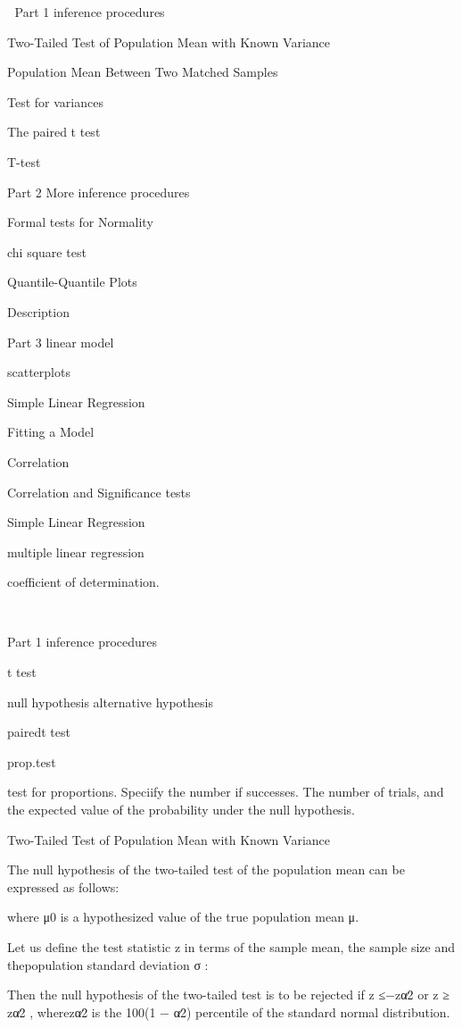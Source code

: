 

Part 1 inference procedures

Two-Tailed Test of Population Mean with Known Variance

Population Mean Between Two Matched Samples

Test for variances

The paired t test

T-test

Part 2 More inference procedures

Formal tests for Normality

chi square test

Quantile-Quantile Plots

Description

Part 3 linear model

scatterplots

Simple Linear Regression

Fitting a Model

Correlation

Correlation and Significance tests

Simple Linear Regression

multiple linear regression

coefficient of determination.




Part 1 inference procedures

t test

null hypothesis alternative hypothesis

pairedt test 

prop.test


test for proportions. Speciify the number if successes.  The number of trials, and the expected value of the probability under the null hypothesis.

Two-Tailed Test of Population Mean with Known Variance

The null hypothesis of the two-tailed test of the population mean can be expressed as follows:



where μ0 is a hypothesized value of the true population mean μ.

Let us define the test statistic z in terms of the sample mean, the sample size and thepopulation standard deviation σ :



Then the null hypothesis of the two-tailed test is to be rejected if z ≤−zα∕2 or z ≥ zα∕2 , wherezα∕2 is the 100(1 − α∕2) percentile of the standard normal distribution.

